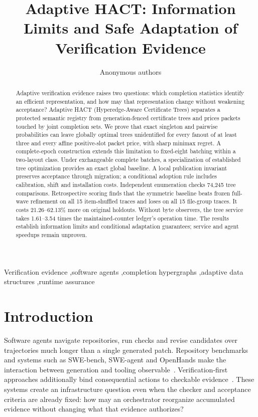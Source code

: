 \documentclass[preprint,12pt]{elsarticle}
\theoremstyle{definition}\newtheorem{definition}[theorem]{Definition}
\begin{document}
\begin{frontmatter}
\title{Adaptive HACT: Information Limits and Safe Adaptation of Verification Evidence}
\author{Anonymous authors}
\begin{abstract}
Adaptive verification evidence raises two questions: which completion
statistics identify an efficient representation, and how may that
representation change without weakening acceptance? Adaptive HACT
(Hyperedge-Aware Certificate Trees) separates a protected semantic registry
from generation-fenced certificate trees and prices packets touched by joint
completion sets. We prove that exact singleton and pairwise probabilities
can leave globally optimal trees unidentified for every fanout of at least
three and every affine positive-slot packet price, with sharp minimax
regret. A complete-epoch construction extends this limitation to fixed-eight
batching within a two-layout class. Under exchangeable complete batches, a
specialization of established tree optimization provides an exact global
baseline. A local publication invariant preserves acceptance through
migration; a conditional adoption rule includes calibration, shift and
installation costs. Independent enumeration checks 74,245 tree comparisons.
Retrospective scoring finds that the symmetric baseline beats frozen
full-wave refinement on all 15 item-shuffled traces and loses on all 15
file-group traces. It costs 21.26--62.13\% more on original holdouts.
Without byte observers, the tree service takes 1.61--3.54 times the
maintained-counter ledger's operation time. The results establish
information limits and conditional adaptation guarantees; service and agent
speedups remain unproven.
\end{abstract}
\begin{keyword}
Verification evidence \sep software agents \sep completion hypergraphs \sep adaptive data structures \sep runtime assurance
\end{keyword}
\end{frontmatter}
\section{Introduction}
Software agents navigate repositories, run checks and revise candidates
over trajectories much longer than a single generated patch. Repository
benchmarks and systems such as SWE-bench, SWE-agent and OpenHands make
the interaction between generation and tooling observable~\cite{swebench,sweagent,openhands}.
Verification-first approaches additionally bind consequential actions to
checkable evidence~\cite{aiware,traceassurance}. These systems create an
infrastructure question even when the checker and acceptance criteria are
already fixed: how may an orchestrator reorganize accumulated evidence
without changing what that evidence authorizes?
\end{document}
